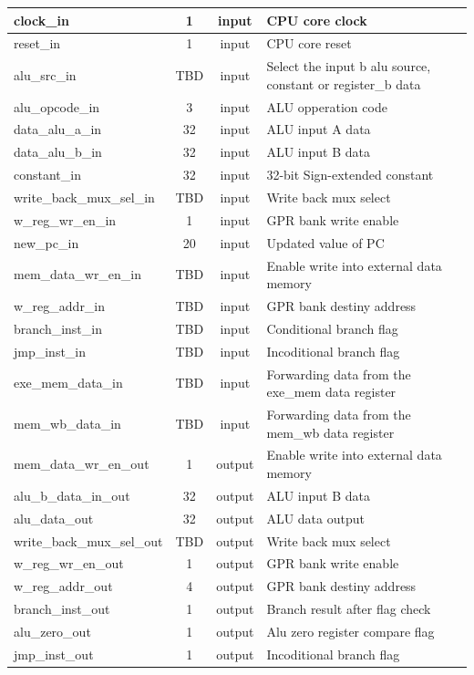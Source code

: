 \documentclass{article}
\begin{document}
\begin{center}
\begin{longtable}[pos]{| l | c | c | m{7cm} |}
        clock\_in               & 1   & input   & CPU core clock    \\ \hline
        reset\_in               & 1   & input   & CPU core reset    \\ \hline
        alu\_src\_in            & TBD & input & Select the input b alu source, constant or register\_b data \\ \hline
        alu\_opcode\_in         & 3  & input  & ALU opperation code  \\ \hline        
        data\_alu\_a\_in        & 32 & input  & ALU input A data  \\ \hline
        data\_alu\_b\_in        & 32 & input  & ALU input B data  \\ \hline
        constant\_in            & 32 & input  & 32-bit Sign-extended constant  \\ \hline
        write\_back\_mux\_sel\_in & TBD & input & Write back mux select \\ \hline  
        w\_reg\_wr\_en\_in    & 1   & input  & GPR bank write enable \\ \hline 
        new\_pc\_in             & 20 & input  & Updated value of PC  \\ \hline 
        mem\_data\_wr\_en\_in & TBD & input & Enable write into external data memory \\ \hline
        w\_reg\_addr\_in & TBD & input & GPR bank destiny address \\ \hline
        branch\_inst\_in & TBD & input & Conditional branch flag \\ \hline
		jmp\_inst\_in & TBD & input & Incoditional branch flag \\ \hline
		exe\_mem\_data\_in & TBD & input & Forwarding data from the exe\_mem data register \\ \hline
		mem\_wb\_data\_in  & TBD & input & Forwarding data from the mem\_wb data register \\ \hline 		
		mem\_data\_wr\_en\_out & 1 & output & Enable write into external data memory \\ \hline
        alu\_b\_data\_in\_out        & 32 & output  & ALU input B data  \\ \hline         
        alu\_data\_out           & 32  & output  & ALU data output \\ \hline
        write\_back\_mux\_sel\_out & TBD & output & Write back mux select \\ \hline  
        w\_reg\_wr\_en\_out    & 1   & output  & GPR bank write enable \\ \hline 
        w\_reg\_addr\_out & 4 & output & GPR bank destiny address \\ \hline
        branch\_inst\_out      & 1   & output  & Branch result after flag check \\ \hline
        alu\_zero\_out & 1 & output & Alu zero register compare flag \\ \hline
        jmp\_inst\_out & 1 & output & Incoditional branch flag \\ \hline

      \end{longtable}
    \end{center} 
     
\end{document}
